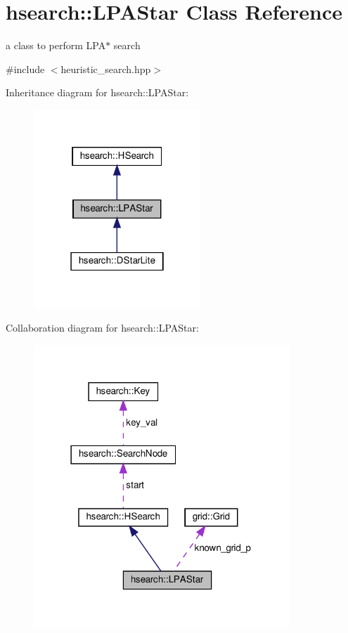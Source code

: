 \hypertarget{classhsearch_1_1LPAStar}{}\section{hsearch\+:\+:L\+P\+A\+Star Class Reference}
\label{classhsearch_1_1LPAStar}


a class to perform L\+P\+A$\ast$ search  




{\ttfamily \#include $<$heuristic\+\_\+search.\+hpp$>$}



Inheritance diagram for hsearch\+:\+:L\+P\+A\+Star\+:
\nopagebreak
\begin{figure}[H]
\begin{center}
\leavevmode
\includegraphics[width=178pt]{d5/da1/classhsearch_1_1LPAStar__inherit__graph}
\end{center}
\end{figure}


Collaboration diagram for hsearch\+:\+:L\+P\+A\+Star\+:
\nopagebreak
\begin{figure}[H]
\begin{center}
\leavevmode
\includegraphics[width=273pt]{dd/d4d/classhsearch_1_1LPAStar__coll__graph}
\end{center}
\end{figure}
